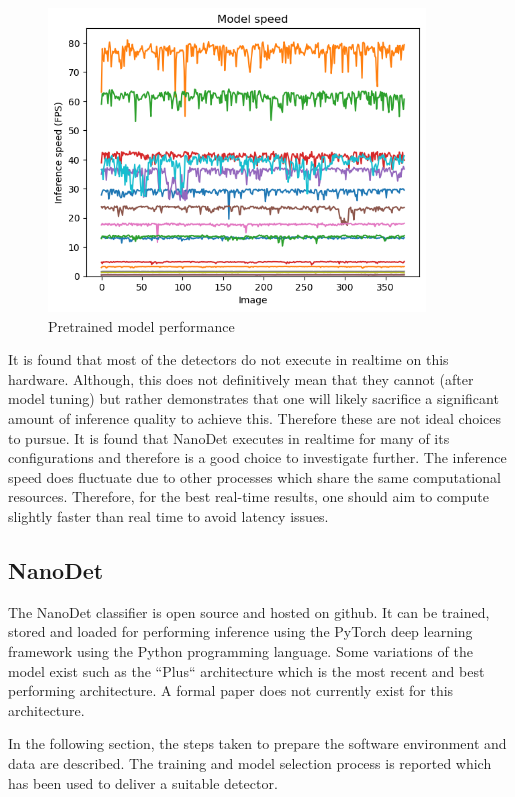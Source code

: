 \documentclass[a4paper,twoside,12pt]{report}
\begin{document}
\begin{figure}[h!]
\begin{center}
\includegraphics[width=10cm]{images/modelspeed.png}
\caption{Pretrained model performance}
\label{fig:modelspeed}
\end{center}
\end{figure}

It is found that most of the detectors do not execute in realtime on this hardware. Although, this does not definitively mean that they cannot (after model tuning) but rather demonstrates that one will likely sacrifice a significant amount of inference quality to achieve this. Therefore these are not ideal choices to pursue. It is found that NanoDet executes in realtime for many of its configurations and therefore is a good choice to investigate further. The inference speed does fluctuate due to other processes which share the same computational resources. Therefore, for the best real-time results, one should aim to compute slightly faster than real time to avoid latency issues. 

\subsection{NanoDet}

The NanoDet classifier is open source and hosted on github. It can be trained, stored and loaded for performing inference using the PyTorch deep learning framework using the Python programming language. Some variations of the model exist such as the ``Plus`` architecture which is the most recent and best performing architecture. A formal paper does not currently exist for this architecture.

In the following section, the steps taken to prepare the software environment and data are described. The training and model selection process is reported which has been used to deliver a suitable detector.
\end{document}
